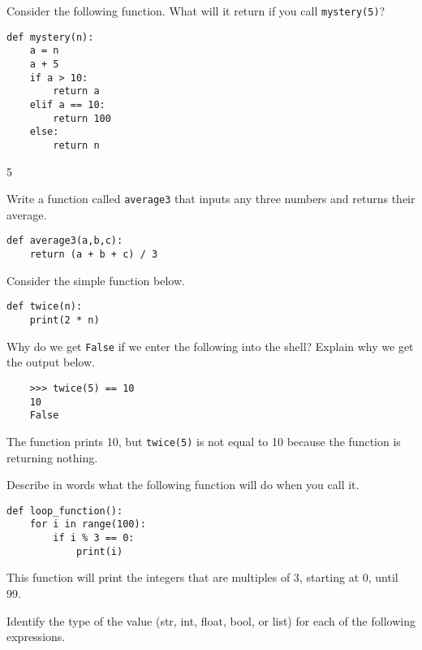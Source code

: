 \documentclass[12pt]{exam}
\begin{document}
\begin{questions}
\begin{parts}
\end{parts} 

\newpage
\question Consider the following function.  What will it return if you call \lstinline{mystery(5)}?

\begin{lstlisting}
def mystery(n):
    a = n 
    a + 5
    if a > 10:
        return a
    elif a == 10:
        return 100
    else:
        return n
\end{lstlisting}
\begin{solution}
5
\end{solution}

\question Write a function called \lstinline{average3} that inputs any three numbers and returns their average.  
\begin{solution}
\begin{lstlisting}
def average3(a,b,c):
    return (a + b + c) / 3
\end{lstlisting}
\end{solution}
\vfill

\question Consider the simple function below.

\begin{lstlisting}
def twice(n):
    print(2 * n)
\end{lstlisting}

Why do we get \lstinline{False} if we enter the following into the shell? Explain why we get the output below. 

\begin{verbatim}
    >>> twice(5) == 10
    10
    False
\end{verbatim}

\begin{solution}
The function prints 10, but \lstinline{twice(5)} is not equal to 10 because the function is returning nothing.  
\end{solution}
\vfill

\question Describe in words what the following function will do when you call it.

\begin{lstlisting}
def loop_function():
    for i in range(100):
        if i % 3 == 0:
            print(i)
\end{lstlisting}

\begin{solution}
This function will print the integers that are multiples of 3, starting at 0, until 99. 
\end{solution}

\question Identify the type of the value (str, int, float, bool, or list) for each of the following expressions.
\begin{parts}

\end{parts}
\end{questions}
\end{document}
